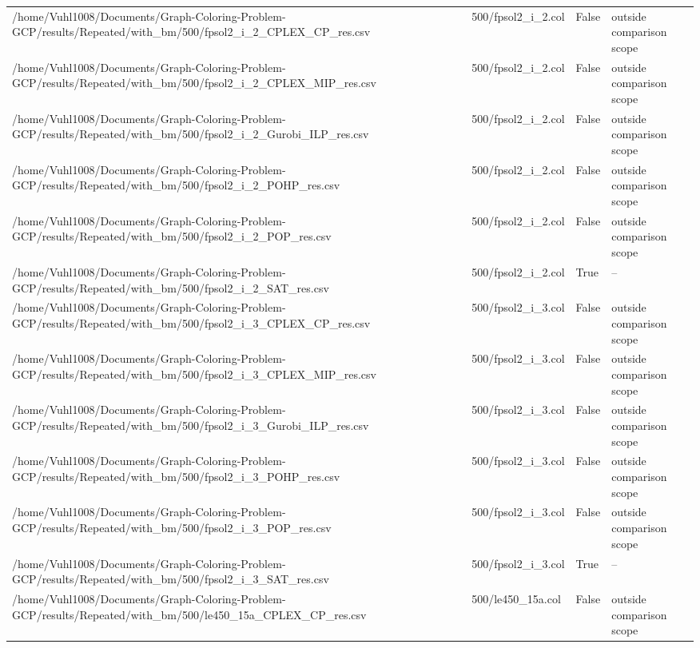 \begin{table}[htbp]
\begin{tabular}{llll}
/home/Vuhl1008/Documents/Graph-Coloring-Problem-GCP/results/Repeated/with\_bm/500/fpsol2\_i\_2\_CPLEX\_CP\_res.csv & 500/fpsol2\_i\_2.col & False & outside comparison scope \\
/home/Vuhl1008/Documents/Graph-Coloring-Problem-GCP/results/Repeated/with\_bm/500/fpsol2\_i\_2\_CPLEX\_MIP\_res.csv & 500/fpsol2\_i\_2.col & False & outside comparison scope \\
/home/Vuhl1008/Documents/Graph-Coloring-Problem-GCP/results/Repeated/with\_bm/500/fpsol2\_i\_2\_Gurobi\_ILP\_res.csv & 500/fpsol2\_i\_2.col & False & outside comparison scope \\
/home/Vuhl1008/Documents/Graph-Coloring-Problem-GCP/results/Repeated/with\_bm/500/fpsol2\_i\_2\_POHP\_res.csv & 500/fpsol2\_i\_2.col & False & outside comparison scope \\
/home/Vuhl1008/Documents/Graph-Coloring-Problem-GCP/results/Repeated/with\_bm/500/fpsol2\_i\_2\_POP\_res.csv & 500/fpsol2\_i\_2.col & False & outside comparison scope \\
/home/Vuhl1008/Documents/Graph-Coloring-Problem-GCP/results/Repeated/with\_bm/500/fpsol2\_i\_2\_SAT\_res.csv & 500/fpsol2\_i\_2.col & True & -- \\
/home/Vuhl1008/Documents/Graph-Coloring-Problem-GCP/results/Repeated/with\_bm/500/fpsol2\_i\_3\_CPLEX\_CP\_res.csv & 500/fpsol2\_i\_3.col & False & outside comparison scope \\
/home/Vuhl1008/Documents/Graph-Coloring-Problem-GCP/results/Repeated/with\_bm/500/fpsol2\_i\_3\_CPLEX\_MIP\_res.csv & 500/fpsol2\_i\_3.col & False & outside comparison scope \\
/home/Vuhl1008/Documents/Graph-Coloring-Problem-GCP/results/Repeated/with\_bm/500/fpsol2\_i\_3\_Gurobi\_ILP\_res.csv & 500/fpsol2\_i\_3.col & False & outside comparison scope \\
/home/Vuhl1008/Documents/Graph-Coloring-Problem-GCP/results/Repeated/with\_bm/500/fpsol2\_i\_3\_POHP\_res.csv & 500/fpsol2\_i\_3.col & False & outside comparison scope \\
/home/Vuhl1008/Documents/Graph-Coloring-Problem-GCP/results/Repeated/with\_bm/500/fpsol2\_i\_3\_POP\_res.csv & 500/fpsol2\_i\_3.col & False & outside comparison scope \\
/home/Vuhl1008/Documents/Graph-Coloring-Problem-GCP/results/Repeated/with\_bm/500/fpsol2\_i\_3\_SAT\_res.csv & 500/fpsol2\_i\_3.col & True & -- \\
/home/Vuhl1008/Documents/Graph-Coloring-Problem-GCP/results/Repeated/with\_bm/500/le450\_15a\_CPLEX\_CP\_res.csv & 500/le450\_15a.col & False & outside comparison scope \\

\end{tabular}
\end{table}
